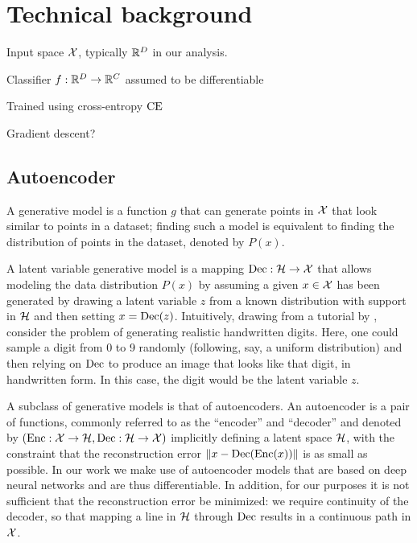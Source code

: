 \documentclass[../main.tex]{subfiles}
\begin{document}
\chapter{Technical background}
\label{ch:background}

Input space $\mathcal{X}$, typically $\mathbb{R}^D$ in our analysis.

Classifier $f: \mathbb{R}^D \to \mathbb{R}^C$ assumed to be differentiable

Trained using cross-entropy $\text{CE}$

Gradient descent?


\section{Autoencoder}

A generative model is a function $g$ that can generate points in $\mathcal{X}$ that look similar to points in a dataset; finding such a model is equivalent to finding the distribution of points in the dataset, denoted by $P(x)$.

A latent variable generative model is a mapping $\operatorname{Dec}: \mathcal{H} \to \mathcal{X}$ that allows modeling the data distribution $P(x)$ by assuming a given $x \in \mathcal{X}$ has been generated by drawing a latent variable $z$ from a known distribution with support in $\mathcal{H}$ and then setting $x = \operatorname{Dec}(z)$.
Intuitively, drawing from a tutorial by \citeauthor{doerschTutorial2021}, consider the problem of generating realistic handwritten digits.
Here, one could sample a digit from 0 to 9 randomly (following, say, a uniform distribution) and then relying on $\operatorname{Dec}$ to produce an image that looks like that digit, in handwritten form. In this case, the digit would be the latent variable $z$.

A subclass of generative models is that of autoencoders.
An autoencoder is a pair of functions, commonly referred to as the ``encoder'' and ``decoder'' and denoted by $(\operatorname{Enc}: \mathcal{X} \to \mathcal{H}, \operatorname{Dec}: \mathcal{H} \to \mathcal{X})$ implicitly defining a latent space $\mathcal{H}$, with the constraint that the reconstruction error $\left\lVert x - \operatorname{Dec}(\operatorname{Enc}(x))\right\rVert$ is as small as possible.
In our work we make use of autoencoder models that are based on deep neural networks and are thus differentiable.
In addition, for our purposes it is not sufficient that the reconstruction error be minimized: we require continuity of the decoder, so that mapping a line in $\mathcal{H}$ through $\operatorname{Dec}$ results in a continuous path in $\mathcal{X}$.
\end{document}
